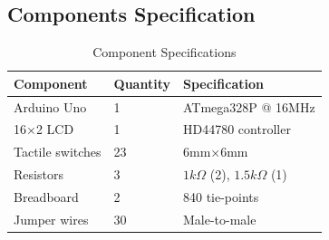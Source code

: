 \documentclass[12pt,a4paper]{article}
\numberwithin{equation}{section}
\numberwithin{figure}{section}
\numberwithin{table}{section}
\begin{document}
\subsection{Components Specification}
\begin{table}[H]
    \centering
    \caption{Component Specifications}
    \begin{tabular}{lll}
        \toprule
        \textbf{Component} & \textbf{Quantity} & \textbf{Specification} \\
        \midrule
        Arduino Uno & 1 & ATmega328P @ 16MHz \\
        16×2 LCD & 1 & HD44780 controller \\
        Tactile switches & 23 & 6mm×6mm \\
        Resistors & 3 & $1k\Omega$ (2), $1.5k\Omega$ (1) \\
        Breadboard & 2 & 840 tie-points \\
        Jumper wires & 30 & Male-to-male \\
        \bottomrule
    \end{tabular}
\end{table}
\end{document}
